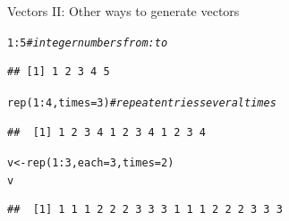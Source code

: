 \documentclass[xcolor=table,           xcolor=dvipsnames]{beamer}\usepackage[]{graphicx}\usepackage[]{color}
\makeatletter
\newcommand{\hlnum}[1]{\textcolor[rgb]{0,0,0}{#1}}
\newcommand{\hlcom}[1]{\textcolor[rgb]{0,0.392,0}{\textit{#1}}}
\newcommand{\hlopt}[1]{\textcolor[rgb]{0,0,0}{#1}}
\newcommand{\hlstd}[1]{\textcolor[rgb]{0,0,0}{#1}}
\newcommand{\hlkwb}[1]{\textcolor[rgb]{0,0,0}{#1}}
\newcommand{\hlkwc}[1]{\textcolor[rgb]{1,0,1}{#1}}
\newcommand{\hlkwd}[1]{\textcolor[rgb]{0,0,1}{#1}}
\newenvironment{kframe}{%
 \def\at@end@of@kframe{}%
 \ifinner\ifhmode%
  \def\at@end@of@kframe{\end{minipage}}%
  \begin{minipage}{\columnwidth}%
 \fi\fi%
 \def\FrameCommand##1{\hskip\@totalleftmargin \hskip-\fboxsep
 \colorbox{shadecolor}{##1}\hskip-\fboxsep
     \hskip-\linewidth \hskip-\@totalleftmargin \hskip\columnwidth}%
 \MakeFramed {\advance\hsize-\width
   \@totalleftmargin\z@ \linewidth\hsize
   \@setminipage}}%
 {\par\unskip\endMakeFramed%
 \at@end@of@kframe}
\newenvironment{knitrout}{}{} %
\makeatother
\begin{document}
\begin{frame}[fragile]{Vectors II: Other ways to generate vectors}
\pause
\begin{knitrout}
\color{fgcolor}\begin{kframe}
\begin{alltt}
\hlnum{1}\hlopt{:}\hlnum{5}  \hlcom{# integer numbers  from : to}
\end{alltt}
\begin{verbatim}
## [1] 1 2 3 4 5
\end{verbatim}
\end{kframe}
\end{knitrout}
\begin{knitrout}
\color{fgcolor}\begin{kframe}
\begin{alltt}
\hlkwd{rep}\hlstd{(}\hlnum{1}\hlopt{:}\hlnum{4}\hlstd{,} \hlkwc{times}\hlstd{=}\hlnum{3}\hlstd{)} \hlcom{# repeat entries several times}
\end{alltt}
\begin{verbatim}
##  [1] 1 2 3 4 1 2 3 4 1 2 3 4
\end{verbatim}
\end{kframe}
\end{knitrout}
\begin{knitrout}
\color{fgcolor}\begin{kframe}
\begin{alltt}
\hlstd{v} \hlkwb{<-} \hlkwd{rep}\hlstd{(}\hlnum{1}\hlopt{:}\hlnum{3}\hlstd{,} \hlkwc{each}\hlstd{=}\hlnum{3}\hlstd{,} \hlkwc{times}\hlstd{=}\hlnum{2}\hlstd{)}
\hlstd{v}
\end{alltt}
\begin{verbatim}
##  [1] 1 1 1 2 2 2 3 3 3 1 1 1 2 2 2 3 3 3
\end{verbatim}
\end{kframe}
\end{knitrout}
\end{frame}

\end{document}
